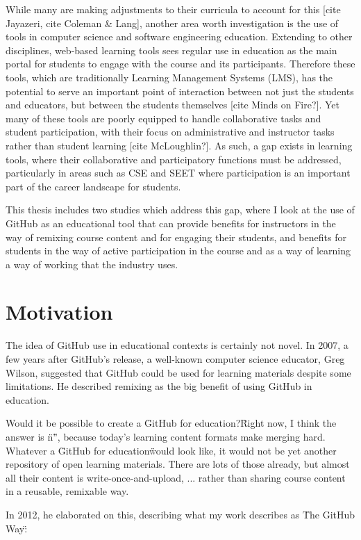 While many are making adjustments to their curricula to account for this [cite Jayazeri, cite Coleman & Lang], another area worth investigation is the use of tools in computer science and software engineering education. Extending to other disciplines, web-based learning tools sees regular use in education as the main portal for students to engage with the course and its participants. Therefore these tools, which are traditionally Learning Management Systems (LMS), has the potential to serve an important point of interaction between not just the students and educators, but between the students themselves [cite Minds on Fire?]. Yet many of these tools are poorly equipped to handle collaborative tasks and student participation, with their focus on administrative and instructor tasks rather than student learning [cite McLoughlin?]. As such, a gap exists in learning tools, where their collaborative and participatory functions must be addressed, particularly in areas such as CSE and SEET where participation is an important part of the career landscape for students.

This thesis includes two studies which address this gap, where I look at the use of GitHub as an educational tool that can provide benefits for instructors in the way of remixing course content and for engaging their students, and benefits for students in the way of active participation in the course and as a way of learning a way of working that the industry uses. %

\section{Motivation}
The idea of GitHub use in educational contexts is certainly not novel. In 2007, a few years after GitHub's release, a well-known computer science educator, Greg Wilson, suggested that GitHub could be used for learning materials despite some limitations. He described remixing as the big benefit of using GitHub in education.

Would it be possible to create a \"GitHub for education?\" Right now, I think the answer is \"n\"”, because today's learning content formats make merging hard. Whatever a \"GitHub for education\" would look like, it would not be yet another repository of open learning materials. There are lots of those already, but almost all their content is write-once-and-upload, ... rather than sharing course content in a reusable, remixable way.

In 2012, he elaborated on this, describing what my work describes as \"The GitHub Way\":

